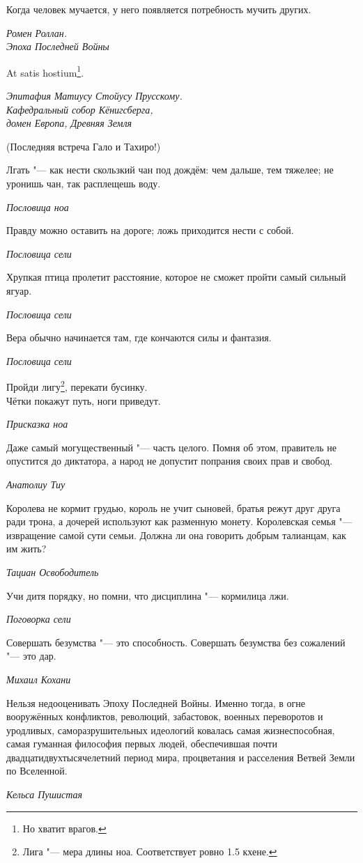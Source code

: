 \documentclass[a4paper,10pt]{book}
\begin{document}
\epigraph{Когда человек мучается, у него появляется потребность мучить других.}
{\textit{Ромен Роллан.\\Эпоха Последней Войны}}

\epigraph{At satis hostium\footnote{Но хватит врагов.}.}
{\textit{Эпитафия Матиусу Стойусу Прусскому.\\Кафедральный собор 
Кёнигсберга,\\домен Европа, Древняя Земля}}

(Последняя встреча Гало и Тахиро!)

\epigraph{Лгать "--- как нести скользкий чан под дождём: чем дальше, тем 
тяжелее; не уронишь чан, так расплещешь воду.}
{\textit{Пословица ноа}}

\epigraph{Правду можно оставить на дороге; ложь приходится нести с собой.}
{\textit{Пословица сели}}

\epigraph{Хрупкая птица пролетит расстояние, которое не сможет пройти самый 
сильный ягуар.}
{\textit{Пословица сели}}

\epigraph{Вера обычно начинается там, где кончаются силы и фантазия.}
{\textit{Пословица сели}}
\epigraph{Пройди лигу\footnote{Лига "--- мера длины ноа. Соответствует ровно 
1.5 
кхене.}, перекати бусинку.\\
Чётки покажут путь, ноги приведут.}
{\textit{Присказка ноа}}

\epigraph{Даже самый могущественный "--- часть целого. Помня об этом, правитель 
не опустится до диктатора, а народ не допустит попрания своих прав и свобод.}
{\textit{Анатолиу Тиу}}

\epigraph{Королева не кормит грудью, король не учит сыновей, братья режут друг 
друга ради трона,
а дочерей используют как разменную монету. Королевская семья "--- извращение 
самой сути семьи. Должна ли она говорить добрым талианцам, как им жить?}
{\textit{Тациан Освободитель}}

\epigraph{Учи дитя порядку, но помни, что дисциплина "--- кормилица лжи.}
{\textit{Поговорка сели}}

\epigraph{Совершать безумства "--- это способность.
Совершать безумства без сожалений "--- это дар.}
{\textit{Михаил Кохани}}

\epigraph{Нельзя недооценивать Эпоху Последней Войны. Именно тогда, в огне 
вооружённых конфликтов, революций, забастовок, военных переворотов и уродливых, 
саморазрушительных идеологий ковалась самая жизнеспособная, самая гуманная 
философия первых людей, обеспечившая почти двадцатидвухтысячелетний период 
мира, 
процветания и расселения Ветвей Земли по Вселенной.}
{\textit{Кельса Пушистая}}
\end{document}
